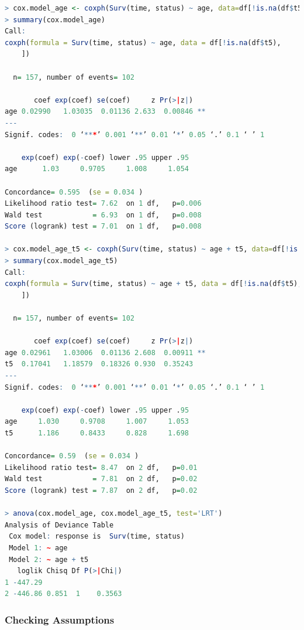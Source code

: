 \begin{lstlisting}[language=R]
> cox.model_age <- coxph(Surv(time, status) ~ age, data=df[!is.na(df$t5), ])
> summary(cox.model_age)
Call:
coxph(formula = Surv(time, status) ~ age, data = df[!is.na(df$t5),
    ])

  n= 157, number of events= 102

       coef exp(coef) se(coef)     z Pr(>|z|)
age 0.02990   1.03035  0.01136 2.633  0.00846 **
---
Signif. codes:  0 ‘***’ 0.001 ‘**’ 0.01 ‘*’ 0.05 ‘.’ 0.1 ‘ ’ 1

    exp(coef) exp(-coef) lower .95 upper .95
age      1.03     0.9705     1.008     1.054

Concordance= 0.595  (se = 0.034 )
Likelihood ratio test= 7.62  on 1 df,   p=0.006
Wald test            = 6.93  on 1 df,   p=0.008
Score (logrank) test = 7.01  on 1 df,   p=0.008

> cox.model_age_t5 <- coxph(Surv(time, status) ~ age + t5, data=df[!is.na(df$t5), ])
> summary(cox.model_age_t5)
Call:
coxph(formula = Surv(time, status) ~ age + t5, data = df[!is.na(df$t5),
    ])

  n= 157, number of events= 102

       coef exp(coef) se(coef)     z Pr(>|z|)
age 0.02961   1.03006  0.01136 2.608  0.00911 **
t5  0.17041   1.18579  0.18326 0.930  0.35243
---
Signif. codes:  0 ‘***’ 0.001 ‘**’ 0.01 ‘*’ 0.05 ‘.’ 0.1 ‘ ’ 1

    exp(coef) exp(-coef) lower .95 upper .95
age     1.030     0.9708     1.007     1.053
t5      1.186     0.8433     0.828     1.698

Concordance= 0.59  (se = 0.034 )
Likelihood ratio test= 8.47  on 2 df,   p=0.01
Wald test            = 7.81  on 2 df,   p=0.02
Score (logrank) test = 7.87  on 2 df,   p=0.02

> anova(cox.model_age, cox.model_age_t5, test='LRT')
Analysis of Deviance Table
 Cox model: response is  Surv(time, status)
 Model 1: ~ age
 Model 2: ~ age + t5
   loglik Chisq Df P(>|Chi|)
1 -447.29
2 -446.86 0.851  1    0.3563
\end{lstlisting}

\subsubsection{Checking Assumptions}
\label{additional:Survival:Rcode:assumptions}

